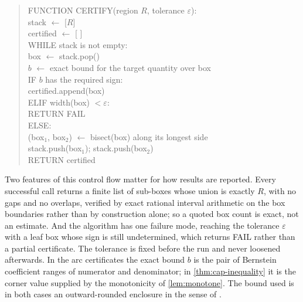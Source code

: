 \documentclass[11pt,reqno]{amsart}
\renewcommand{\_}{\origunderscore\allowbreak}
\numberwithin{equation}{section}
\theoremstyle{plain}
\theoremstyle{definition}
\theoremstyle{remark}
\begin{document}
\begin{quote}\ttfamily\small
\noindent
FUNCTION CERTIFY(region $R$, tolerance $\varepsilon$):\\
\hspace*{1.5em}stack $\leftarrow$ [$R$]\\
\hspace*{1.5em}certified $\leftarrow$ [ ]\\
\hspace*{1.5em}WHILE stack is not empty:\\
\hspace*{3em}box $\leftarrow$ stack.pop()\\
\hspace*{3em}$b$ $\leftarrow$ exact bound for the target quantity over box\\
\hspace*{3em}IF $b$ has the required sign:\\
\hspace*{4.5em}certified.append(box)\\
\hspace*{3em}ELIF width(box) $<\varepsilon$:\\
\hspace*{4.5em}RETURN FAIL\\
\hspace*{3em}ELSE:\\
\hspace*{4.5em}(box$_1$, box$_2$) $\leftarrow$ bisect(box) along its longest side\\
\hspace*{4.5em}stack.push(box$_1$); stack.push(box$_2$)\\
\hspace*{1.5em}RETURN certified
\end{quote}

Two features of this control flow matter for how results are reported.
Every successful call returns a finite list of sub-boxes whose union is
exactly $R$, with no gaps and no overlaps, verified by exact rational
interval arithmetic on the box boundaries rather than by construction
alone; so a quoted box count is exact, not an estimate. And the
algorithm has one failure mode, reaching the tolerance $\varepsilon$
with a leaf box whose sign is still undetermined, which returns FAIL
rather than a partial certificate. The tolerance is fixed before the
run and never loosened afterwards. In the arc certificates the exact
bound $b$ is the pair of Bernstein coefficient ranges of numerator and
denominator; in \cref{thm:cap-inequality} it is the corner value
supplied by the monotonicity of \cref{lem:monotone}. The bound used is
in both cases an outward-rounded enclosure in the sense of
\cite[Ch.~5]{MKC09}.
\end{document}
